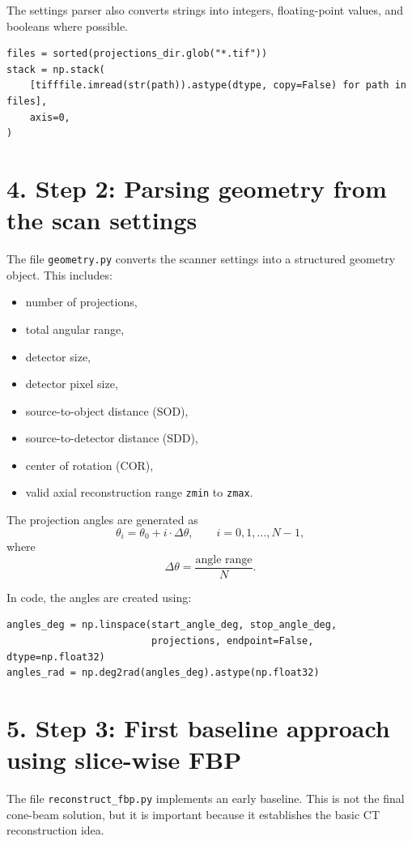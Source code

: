 \documentclass[12pt,a4paper]{article}
\begin{document}
The settings parser also converts strings into integers, floating-point values, and booleans where possible.

\begin{lstlisting}[style=py,caption={Core idea of projection loading}]
files = sorted(projections_dir.glob("*.tif"))
stack = np.stack(
    [tifffile.imread(str(path)).astype(dtype, copy=False) for path in files],
    axis=0,
)
\end{lstlisting}

\section*{4. Step 2: Parsing geometry from the scan settings}
The file \texttt{geometry.py} converts the scanner settings into a structured geometry object. This includes:
\begin{itemize}[leftmargin=*]
\item number of projections,
\item total angular range,
\item detector size,
\item detector pixel size,
\item source-to-object distance (SOD),
\item source-to-detector distance (SDD),
\item center of rotation (COR),
\item valid axial reconstruction range \texttt{zmin} to \texttt{zmax}.
\end{itemize}

The projection angles are generated as
\[
\theta_i = \theta_0 + i \cdot \Delta \theta,\qquad i=0,1,\dots,N-1,
\]
where
\[
\Delta \theta = \frac{\text{angle range}}{N}.
\]

In code, the angles are created using:
\begin{lstlisting}[style=py,caption={Angle generation}]
angles_deg = np.linspace(start_angle_deg, stop_angle_deg,
                         projections, endpoint=False, dtype=np.float32)
angles_rad = np.deg2rad(angles_deg).astype(np.float32)
\end{lstlisting}

\section*{5. Step 3: First baseline approach using slice-wise FBP}
The file \texttt{reconstruct\_fbp.py} implements an early baseline. This is not the final cone-beam solution, but it is important because it establishes the basic CT reconstruction idea.
\end{document}
